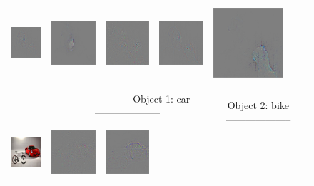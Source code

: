 \begin{figure}
\begin{center}
\begin{tabular}{ccccccc}
\includegraphics[width=0.14\linewidth,height=0.115\linewidth]{figs/examples/googlenet/deconv/dog-cat4_diff_243} &
\includegraphics[width=0.14\linewidth,height=0.115\linewidth]{figs/examples/googlenet/soft/dog-cat4_diff_243} &
\includegraphics[width=0.14\linewidth,height=0.115\linewidth]{figs/examples/googlenet/oxford/dog-cat4_diff_286} &
\includegraphics[width=0.14\linewidth,height=0.115\linewidth]{figs/examples/googlenet/deconv/dog-cat4_diff_286} &
\includegraphics[width=0.14\linewidth,height=0.115\linewidth]{figs/examples/googlenet/soft/dog-cat4_diff_286} \\
& \multicolumn{3}{c}{\small -------------------- Object 1: car --------------------} & \multicolumn{3}{c}{\small -------------------- Object 2: bike --------------------} \\
\vspace{-2.5pt}
\includegraphics[width=0.14\linewidth,height=0.115\linewidth]{figs/examples/googlenet/oxford/bic-car1} &
\includegraphics[width=0.14\linewidth,height=0.115\linewidth]{figs/examples/googlenet/oxford/bic-car1_diff_818} &
\includegraphics[width=0.14\linewidth,height=0.115\linewidth]{figs/examples/googlenet/deconv/bic-car1_diff_818} &

\end{tabular}
\end{center}
\end{figure}

